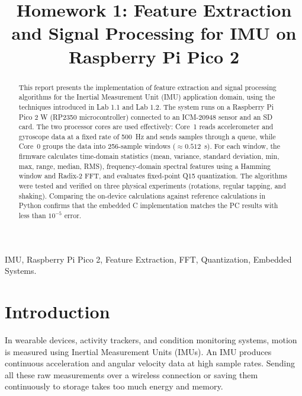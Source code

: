 \documentclass[conference]{IEEEtran}
\begin{document}
\title{Homework 1: Feature Extraction and Signal Processing for IMU on Raspberry Pi Pico 2}

\author{
}

\maketitle

\begin{abstract}
This report presents the implementation of feature extraction and signal processing algorithms for the Inertial Measurement Unit (IMU) application domain, using the techniques introduced in Lab 1.1 and Lab 1.2. The system runs on a Raspberry Pi Pico 2 W (RP2350 microcontroller) connected to an ICM-20948 sensor and an SD card. The two processor cores are used effectively: Core~1 reads accelerometer and gyroscope data at a fixed rate of 500~Hz and sends samples through a queue, while Core~0 groups the data into 256-sample windows ($\approx 0.512$~s). For each window, the firmware calculates time-domain statistics (mean, variance, standard deviation, min, max, range, median, RMS), frequency-domain spectral features using a Hamming window and Radix-2 FFT, and evaluates fixed-point Q15 quantization. The algorithms were tested and verified on three physical experiments (rotations, regular tapping, and shaking). Comparing the on-device calculations against reference calculations in Python confirms that the embedded C implementation matches the PC results with less than $10^{-5}$ error.
\end{abstract}

\begin{IEEEkeywords}
IMU, Raspberry Pi Pico 2, Feature Extraction, FFT, Quantization, Embedded Systems.
\end{IEEEkeywords}

\section{Introduction}
In wearable devices, activity trackers, and condition monitoring systems, motion is measured using Inertial Measurement Units (IMUs). An IMU produces continuous acceleration and angular velocity data at high sample rates. Sending all these raw measurements over a wireless connection or saving them continuously to storage takes too much energy and memory.
\end{document}
